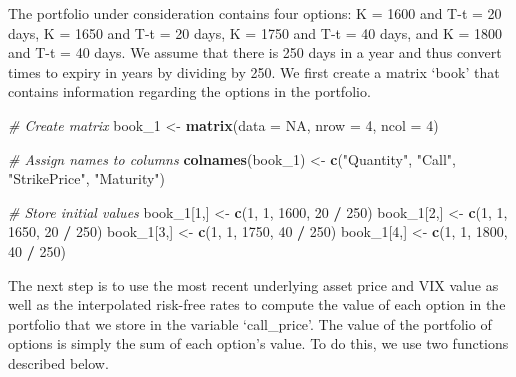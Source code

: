 \documentclass[]{article}
\newenvironment{Shaded}{\begin{snugshade}}{\end{snugshade}}
\newcommand{\CommentTok}[1]{\textcolor[rgb]{0.56,0.35,0.01}{\textit{#1}}}
\newcommand{\DataTypeTok}[1]{\textcolor[rgb]{0.13,0.29,0.53}{#1}}
\newcommand{\DecValTok}[1]{\textcolor[rgb]{0.00,0.00,0.81}{#1}}
\newcommand{\KeywordTok}[1]{\textcolor[rgb]{0.13,0.29,0.53}{\textbf{#1}}}
\newcommand{\NormalTok}[1]{#1}
\newcommand{\OperatorTok}[1]{\textcolor[rgb]{0.81,0.36,0.00}{\textbf{#1}}}
\newcommand{\OtherTok}[1]{\textcolor[rgb]{0.56,0.35,0.01}{#1}}
\newcommand{\StringTok}[1]{\textcolor[rgb]{0.31,0.60,0.02}{#1}}
\begin{document}
The portfolio under consideration contains four options: K = 1600 and
T-t = 20 days, K = 1650 and T-t = 20 days, K = 1750 and T-t = 40 days,
and K = 1800 and T-t = 40 days. We assume that there is 250 days in a
year and thus convert times to expiry in years by dividing by 250. We
first create a matrix `book' that contains information regarding the
options in the portfolio.

\begin{Shaded}
\begin{Highlighting}[]
\CommentTok{# Create matrix}
\NormalTok{book_}\DecValTok{1}\NormalTok{ <-}\StringTok{ }\KeywordTok{matrix}\NormalTok{(}\DataTypeTok{data =} \OtherTok{NA}\NormalTok{, }\DataTypeTok{nrow =} \DecValTok{4}\NormalTok{, }\DataTypeTok{ncol =} \DecValTok{4}\NormalTok{)}

\CommentTok{# Assign names to columns}
\KeywordTok{colnames}\NormalTok{(book_}\DecValTok{1}\NormalTok{) <-}\StringTok{ }\KeywordTok{c}\NormalTok{(}\StringTok{"Quantity"}\NormalTok{, }\StringTok{"Call"}\NormalTok{, }\StringTok{"StrikePrice"}\NormalTok{, }\StringTok{"Maturity"}\NormalTok{)}

\CommentTok{# Store initial values}
\NormalTok{book_}\DecValTok{1}\NormalTok{[}\DecValTok{1}\NormalTok{,] <-}\StringTok{ }\KeywordTok{c}\NormalTok{(}\DecValTok{1}\NormalTok{, }\DecValTok{1}\NormalTok{, }\DecValTok{1600}\NormalTok{, }\DecValTok{20} \OperatorTok{/}\StringTok{ }\DecValTok{250}\NormalTok{)}
\NormalTok{book_}\DecValTok{1}\NormalTok{[}\DecValTok{2}\NormalTok{,] <-}\StringTok{ }\KeywordTok{c}\NormalTok{(}\DecValTok{1}\NormalTok{, }\DecValTok{1}\NormalTok{, }\DecValTok{1650}\NormalTok{, }\DecValTok{20} \OperatorTok{/}\StringTok{ }\DecValTok{250}\NormalTok{)}
\NormalTok{book_}\DecValTok{1}\NormalTok{[}\DecValTok{3}\NormalTok{,] <-}\StringTok{ }\KeywordTok{c}\NormalTok{(}\DecValTok{1}\NormalTok{, }\DecValTok{1}\NormalTok{, }\DecValTok{1750}\NormalTok{, }\DecValTok{40} \OperatorTok{/}\StringTok{ }\DecValTok{250}\NormalTok{)}
\NormalTok{book_}\DecValTok{1}\NormalTok{[}\DecValTok{4}\NormalTok{,] <-}\StringTok{ }\KeywordTok{c}\NormalTok{(}\DecValTok{1}\NormalTok{, }\DecValTok{1}\NormalTok{, }\DecValTok{1800}\NormalTok{, }\DecValTok{40} \OperatorTok{/}\StringTok{ }\DecValTok{250}\NormalTok{)}
\end{Highlighting}
\end{Shaded}

The next step is to use the most recent underlying asset price and VIX
value as well as the interpolated risk-free rates to compute the value
of each option in the portfolio that we store in the variable
`call\_price'. The value of the portfolio of options is simply the sum
of each option's value. To do this, we use two functions described
below.
\end{document}
